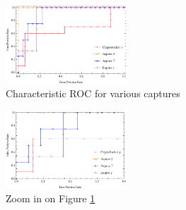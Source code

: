 \documentclass[13pt,journal,compsoc,onecolumn]{IEEEtran}
\begin{document}
\begin{figure}[!h]
 \centering
 \includegraphics[width=0.4\textwidth]{roc1.pdf}
 \caption{Characteristic ROC for various captures \label{fig:roc1}}
\end{figure} 

\begin{figure}[!h]
 \centering
 \includegraphics[width=0.4\textwidth]{roc2.pdf}
 \caption{Zoom in on Figure \ref{fig:roc1} \label{fig:roc2}}
\end{figure} 
\end{document}
